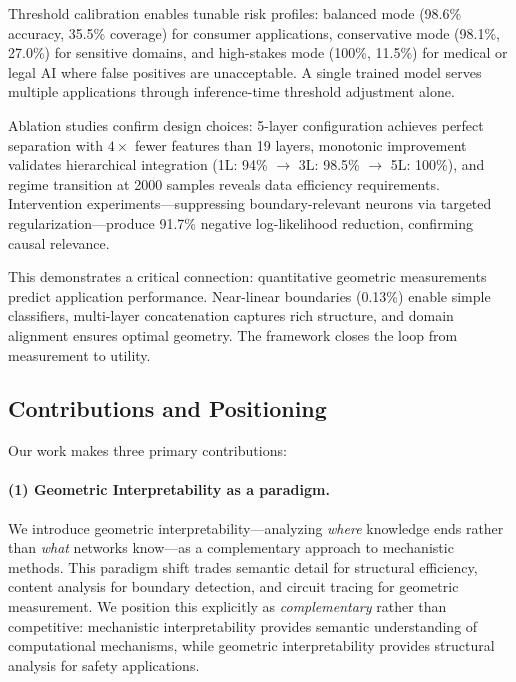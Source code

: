 \documentclass[11pt]{article}
\begin{document}
Threshold calibration enables tunable risk profiles: balanced mode (98.6\% accuracy, 35.5\% coverage) for consumer applications, conservative mode (98.1\%, 27.0\%) for sensitive domains, and high-stakes mode (100\%, 11.5\%) for medical or legal AI where false positives are unacceptable. A single trained model serves multiple applications through inference-time threshold adjustment alone.

Ablation studies confirm design choices: 5-layer configuration achieves perfect separation with $4\times$ fewer features than 19 layers, monotonic improvement validates hierarchical integration (1L: 94\% $\to$ 3L: 98.5\% $\to$ 5L: 100\%), and regime transition at 2000 samples reveals data efficiency requirements. Intervention experiments---suppressing boundary-relevant neurons via targeted regularization---produce 91.7\% negative log-likelihood reduction, confirming causal relevance.

This demonstrates a critical connection: quantitative geometric measurements predict application performance. Near-linear boundaries (0.13\%) enable simple classifiers, multi-layer concatenation captures rich structure, and domain alignment ensures optimal geometry. The framework closes the loop from measurement to utility.

\subsection{Contributions and Positioning}
\label{sec:intro-contributions}

Our work makes three primary contributions:

\paragraph{(1) Geometric Interpretability as a paradigm.} We introduce geometric interpretability---analyzing \textit{where} knowledge ends rather than \textit{what} networks know---as a complementary approach to mechanistic methods. This paradigm shift trades semantic detail for structural efficiency, content analysis for boundary detection, and circuit tracing for geometric measurement. We position this explicitly as \textit{complementary} rather than competitive: mechanistic interpretability provides semantic understanding of computational mechanisms, while geometric interpretability provides structural analysis for safety applications.
\end{document}
